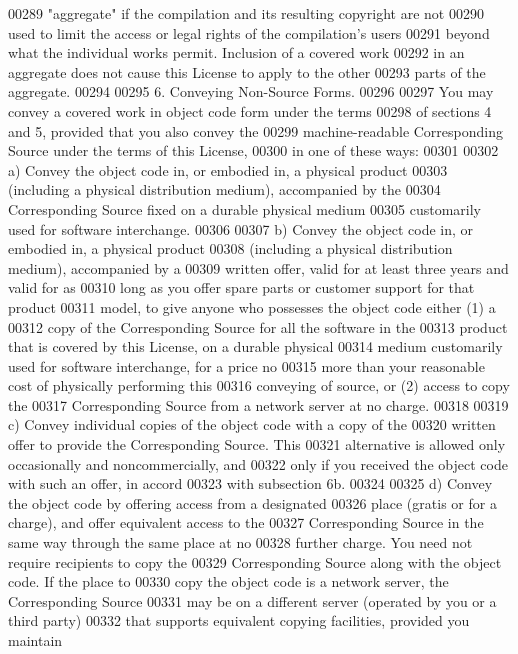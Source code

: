 \begin{DoxyCode}
00289 "aggregate" if the compilation and its resulting copyright are not
00290 used to limit the access or legal rights of the compilation's users
00291 beyond what the individual works permit.  Inclusion of a covered work
00292 in an aggregate does not cause this License to apply to the other
00293 parts of the aggregate.
00294 
00295   6. Conveying Non-Source Forms.
00296 
00297   You may convey a covered work in object code form under the terms
00298 of sections 4 and 5, provided that you also convey the
00299 machine-readable Corresponding Source under the terms of this License,
00300 in one of these ways:
00301 
00302     a) Convey the object code in, or embodied in, a physical product
00303     (including a physical distribution medium), accompanied by the
00304     Corresponding Source fixed on a durable physical medium
00305     customarily used for software interchange.
00306 
00307     b) Convey the object code in, or embodied in, a physical product
00308     (including a physical distribution medium), accompanied by a
00309     written offer, valid for at least three years and valid for as
00310     long as you offer spare parts or customer support for that product
00311     model, to give anyone who possesses the object code either (1) a
00312     copy of the Corresponding Source for all the software in the
00313     product that is covered by this License, on a durable physical
00314     medium customarily used for software interchange, for a price no
00315     more than your reasonable cost of physically performing this
00316     conveying of source, or (2) access to copy the
00317     Corresponding Source from a network server at no charge.
00318 
00319     c) Convey individual copies of the object code with a copy of the
00320     written offer to provide the Corresponding Source.  This
00321     alternative is allowed only occasionally and noncommercially, and
00322     only if you received the object code with such an offer, in accord
00323     with subsection 6b.
00324 
00325     d) Convey the object code by offering access from a designated
00326     place (gratis or for a charge), and offer equivalent access to the
00327     Corresponding Source in the same way through the same place at no
00328     further charge.  You need not require recipients to copy the
00329     Corresponding Source along with the object code.  If the place to
00330     copy the object code is a network server, the Corresponding Source
00331     may be on a different server (operated by you or a third party)
00332     that supports equivalent copying facilities, provided you maintain

\end{DoxyCode}
